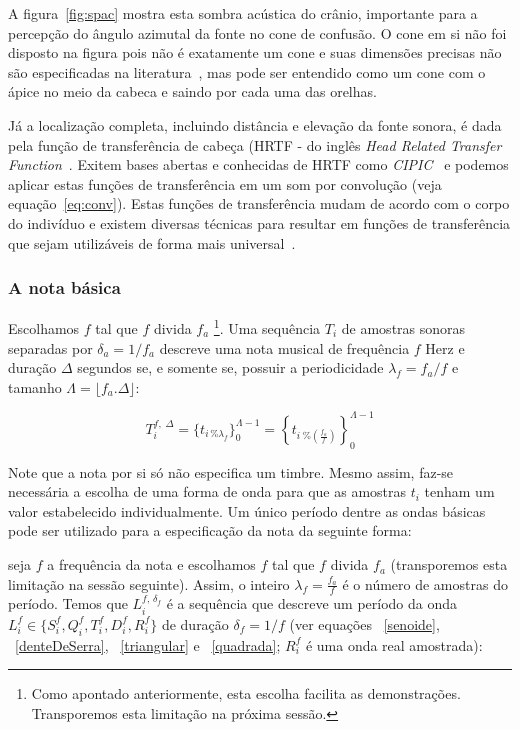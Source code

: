 A figura~\ref{fig:spac} mostra esta sombra acústica do crânio, importante para a percepção do ângulo azimutal da fonte no cone de confusão. O cone em si não foi disposto na figura pois não é exatamente um cone e suas dimensões precisas não são especificadas na literatura~\cite{confCone}, mas pode ser entendido como um cone com o ápice no meio da cabeca e saindo por cada uma das orelhas.

Já a localização completa, incluindo distância e elevação da fonte sonora, é dada pela função de transferência de cabeça (HRTF - do inglês \emph{Head Related Transfer Function}~\cite{hrtf}. Exitem bases abertas e conhecidas de HRTF como \emph{CIPIC}~\cite{CIPIC} e podemos aplicar estas funções de transferência em um som por convolução (veja equação~\ref{eq:conv}). Estas funções de transferência mudam de acordo com o corpo do indivíduo e existem diversas técnicas para resultar em funções de transferência que sejam utilizáveis de forma mais universal~\cite{lazaSPA}. 


\subsubsection{A nota básica}\label{notaBasica}

Escolhamos $f$ tal que $f$ divida $f_a$  
 \footnote{Como apontado anteriormente, esta escolha facilita as demonstrações.
Transporemos esta limitação na próxima sessão.}. 
Uma sequência $T_i$ de amostras sonoras separadas por $\delta_a=1/f_a$ descreve uma nota musical de frequência $f$ Herz e duração $\Delta$ segundos se, e somente se, possuir a periodicidade $\lambda_f=f_a/f$
 e tamanho $\Lambda=\lfloor f_a . \Delta \rfloor $:

\begin{equation}
T_i^{f,\; \Delta}=\{t_{i \, \% \lambda_f} \}_0^{\Lambda-1}= \left \{t_{i \; \% \left( \frac{f_a}{f} \right) } \right \}_0^{\Lambda-1}
\end{equation}

Note que a nota por si só não especifica um timbre. Mesmo assim, faz-se necessária a escolha de uma forma de onda para que as amostras $t_i$ tenham um valor estabelecido individualmente. Um único período dentre as ondas básicas pode ser utilizado para a especificação da nota da seguinte forma:

seja $f$ a frequência da nota e escolhamos $f$ tal que $f$ divida $f_a$ (transporemos esta limitação na sessão seguinte). Assim, o inteiro $\lambda_f=\frac{f_a}{f}$ é o número de amostras do período. Temos que $L_i^{f,\, \delta_f} $ é
a sequência que descreve um período da onda $L_i^f \in \{S_i^f,Q_i^f,T_i^f,D_i^f,R_i^f \}$ de duração 
$\delta_f=1/f$ (ver equações ~\ref{senoide}, ~\ref{denteDeSerra}, ~\ref{triangular} e ~\ref{quadrada}; $R_i^f$ 
é uma onda real amostrada):


